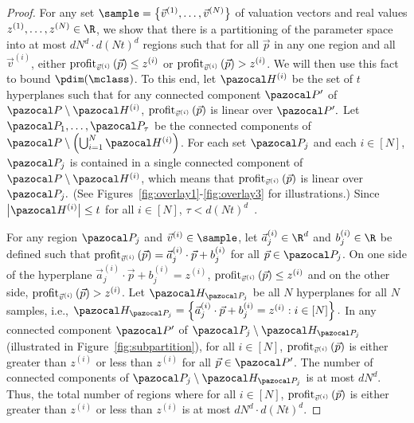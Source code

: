 \begin{proof}
For any set $\sample = \left\{\vec{v}^{(1)}, \dots, \vec{v}^{(N)}\right\}$ of valuation vectors and real values $z^{(1)}, \dots, z^{(N)} \in \R$, we show that there is a partitioning of the parameter space into at most  $dN^d\cdot d(Nt)^d$ regions such that for all $\vec{p}$ in any one region and all $\vec{v}^{(i)}$, either $\textnormal{profit}_{\vec{v}^{(i)}}\left(\vec{p}\right) \leq z^{(i)}$ or $\textnormal{profit}_{\vec{v}^{(i)}}\left(\vec{p}\right) > z^{(i)}$. We will then use this fact to bound $\pdim(\mclass)$.
To this end, let $\hyp^{(i)}$ be the set of $t$ hyperplanes such
that for any connected component $\pspace'$ of $\pspace \setminus \hyp^{(i)}$, $\textnormal{profit}_{\vec{v}^{(i)}}\left(\vec{p}\right)$ is linear over $\pspace'.$ Let $\pspace_1, \dots, \pspace_{\tau}$ be the connected components
of $\pspace \setminus \left(\bigcup_{i = 1}^N \hyp^{(i)}\right)$. For each set $\pspace_j$ and each $i \in [N]$, $\pspace_j$ is contained in a single connected component of $\pspace \setminus \hyp^{(i)}$, which means that $\textnormal{profit}_{\vec{v}^{(i)}}\left(\vec{p}\right)$ is linear over $\pspace_j.$
(See Figures~\ref{fig:overlay1}-\ref{fig:overlay3} for illustrations.)
Since $\left|\hyp^{(i)}\right|\leq t$ for all $i \in [N]$, $\tau < d(Nt)^d$~\citep[][Theorem 1]{Buck43:Partition}.

For any region $\pspace_j$ and $\vec{v}^{(i)} \in \sample$,
let  $\vec{a}_j^{(i)} \in \R^d$ and $b_j^{(i)} \in \R$ be defined
such that $\textnormal{profit}_{\vec{v}^{(i)}}\left(\vec{p}\right) = \vec{a}_j^{(i)} \cdot \vec{p} + b_j^{(i)}$ for all $\vec{p} \in \pspace_j$. On one side of the
hyperplane $\vec{a}_j^{(i)} \cdot \vec{p} + b_j^{(i)} = z^{(i)}$, $\textnormal{profit}_{\vec{v}^{(i)}}\left(\vec{p}\right) \leq z^{(i)}$ and on the other
side, $\textnormal{profit}_{\vec{v}^{(i)}}\left(\vec{p}\right) > z^{(i)}$.
Let $\hyp_{\pspace_j}$ be all $N$ hyperplanes for all $N$ samples, i.e., $\hyp_{\pspace_j} = \left\{\vec{a}_j^{(i)} \cdot \vec{p} + b_j^{(i)} = z^{(i)} : i \in [N]\right\}.$ In any
connected component $\pspace'$ of $\pspace_j \setminus \hyp_{\pspace_j}$ (illustrated in Figure~\ref{fig:subpartition}), for all $i \in [N]$, $\textnormal{profit}_{\vec{v}^{(i)}}\left(\vec{p}\right)$ is either greater than $z^{(i)}$ or
less than $z^{(i)}$  for all $\vec{p} \in \pspace'$. The number of
connected components of $\pspace_j \setminus \hyp_{\pspace_j}$ is at most $dN^d$.
Thus, the total number of regions where
for all $i \in [N]$, $\textnormal{profit}_{\vec{v}^{(i)}}\left(\vec{p}\right)$ is either greater
than $z^{(i)}$ or less than $z^{(i)}$ is at most $dN^d\cdot d(Nt)^d$.


\end{proof}
